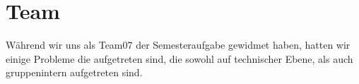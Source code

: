 \section*{Team}
Während wir uns als Team07 der Semesteraufgabe gewidmet
haben, hatten wir einige Probleme die aufgetreten sind,
die sowohl auf technischer Ebene, als auch gruppenintern
aufgetreten sind.
